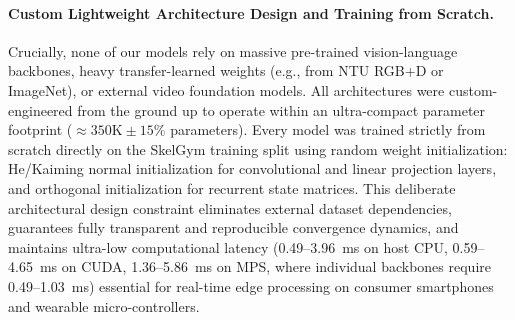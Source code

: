 \documentclass[runningheads]{llncs}
\begin{document}
\paragraph{Custom Lightweight Architecture Design and Training from Scratch.} Crucially, none of our models rely on massive pre-trained vision-language backbones, heavy transfer-learned weights (e.g., from NTU RGB+D or ImageNet), or external video foundation models. All architectures were custom-engineered from the ground up to operate within an ultra-compact parameter footprint ($\approx 350\text{K} \pm 15\%$ parameters). Every model was trained strictly from scratch directly on the SkelGym training split using random weight initialization: He/Kaiming normal initialization \cite{he2015delving} for convolutional and linear projection layers, and orthogonal initialization for recurrent state matrices. This deliberate architectural design constraint eliminates external dataset dependencies, guarantees fully transparent and reproducible convergence dynamics, and maintains ultra-low computational latency (0.49--3.96~ms on host CPU, 0.59--4.65~ms on CUDA, 1.36--5.86~ms on MPS, where individual backbones require 0.49--1.03~ms) essential for real-time edge processing on consumer smartphones and wearable micro-controllers.
\end{document}
